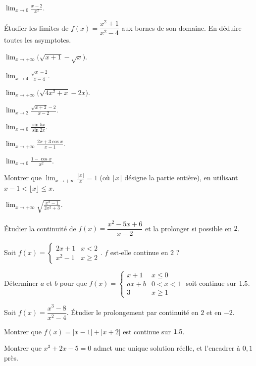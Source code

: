 \exo{} $\displaystyle\lim_{x\to0}\frac{x-2}{x^{2}}$.

\exo{} Étudier les limites de $f(x)=\dfrac{x^{2}+1}{x^{2}-4}$ aux bornes de son domaine. En déduire toutes les asymptotes.

\exo{} $\displaystyle\lim_{x\to+\infty}\big(\sqrt{x+1}-\sqrt{x}\big)$.

\exo{} $\displaystyle\lim_{x\to4}\frac{\sqrt x-2}{x-4}$.

\exo{} $\displaystyle\lim_{x\to+\infty}\big(\sqrt{4x^{2}+x}-2x\big)$.

\exo{} $\displaystyle\lim_{x\to2}\frac{\sqrt{x+2}-2}{x-2}$.

\exo{} $\displaystyle\lim_{x\to0}\frac{\sin 5x}{\sin 2x}$.

\exo{} $\displaystyle\lim_{x\to+\infty}\frac{2x+3\cos x}{x-1}$.

\exo{} $\displaystyle\lim_{x\to0}\frac{1-\cos x}{x^{2}}$.

\exo{} Montrer que $\displaystyle\lim_{x\to+\infty}\frac{\lfloor x\rfloor}{x}=1$ (où $\lfloor x\rfloor$ désigne la partie entière), en utilisant $x-1<\lfloor x\rfloor\le x$.

\exo{} $\displaystyle\lim_{x\to+\infty}\sqrt{\frac{x^{2}-1}{2x^{2}+3}}$.

\exo{} Étudier la continuité de $f(x)=\dfrac{x^{2}-5x+6}{x-2}$ et la prolonger si possible en $2$.

\exo{} Soit $f(x)=\begin{cases}2x+1 & x<2\\ x^{2}-1 & x\ge2\end{cases}$. $f$ est-elle continue en $2$ ?

\exo{} Déterminer $a$ et $b$ pour que $f(x)=\begin{cases}x+1 & x\le0\\ ax+b & 0<x<1\\ 3 & x\ge1\end{cases}$ soit continue sur $1.5$.

\exo{} Soit $f(x)=\dfrac{x^{3}-8}{x^{2}-4}$. Étudier le prolongement par continuité en $2$ et en $-2$.

\exo{} Montrer que $f(x)=|x-1|+|x+2|$ est continue sur $1.5$.

\exo{} Montrer que $x^{3}+2x-5=0$ admet une unique solution réelle, et l'encadrer à $0{,}1$ près.

